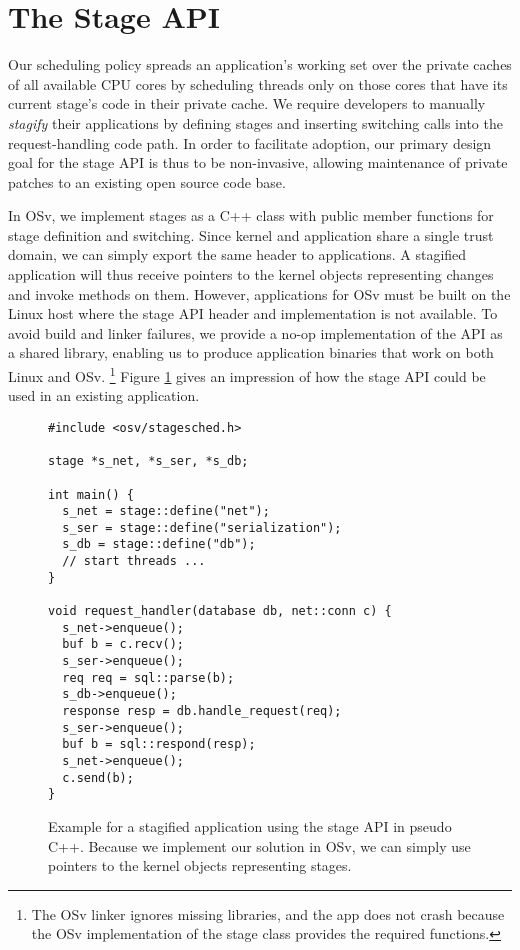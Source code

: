 \documentclass[12pt,a4paper]{book}
\begin{document}
\section{The Stage API}\label{ch:di:api}
Our scheduling policy spreads an application's working set over the private caches of all available CPU cores by scheduling threads only on those cores that have its current stage's code in their private cache.
We require developers to manually \emph{stagify} their applications by defining stages and inserting switching calls into the request-handling code path.
In order to facilitate adoption, our primary design goal for the stage API is thus to be non-invasive, allowing maintenance of private patches to an existing open source code base.

In OSv, we implement stages as a C++ class with public member functions for stage definition and switching.
Since kernel and application share a single trust domain, we can simply export the same header to applications.
A stagified application will thus receive pointers to the kernel objects representing changes and invoke methods on them.
However, applications for OSv must be built on the Linux host where the stage API header and implementation is not available.
To avoid build and linker failures, we provide a no-op implementation of the API as a shared library, enabling us to produce application binaries that work on both Linux and OSv.%
\footnote{The OSv linker ignores missing libraries, and the app does not crash because the OSv implementation of the stage class provides the required functions.}
Figure \ref{fig:di:api:exampleraw} gives an impression of how the stage API could be used in an existing application.

\begin{figure}[H]
\begin{lstlisting}[style=figurecpp,morekeywords={stage,stage::define,enqueue}]
#include <osv/stagesched.h>

stage *s_net, *s_ser, *s_db;

int main() {
  s_net = stage::define("net");
  s_ser = stage::define("serialization");
  s_db = stage::define("db");
  // start threads ...
}

void request_handler(database db, net::conn c) {
  s_net->enqueue();
  buf b = c.recv();
  s_ser->enqueue();
  req req = sql::parse(b);
  s_db->enqueue();
  response resp = db.handle_request(req);
  s_ser->enqueue();
  buf b = sql::respond(resp);
  s_net->enqueue();
  c.send(b);
}
\end{lstlisting}
\caption{Example for a stagified application using the stage API in pseudo C++. Because we implement our solution in OSv, we can simply use pointers to the kernel objects representing stages.}
\label{fig:di:api:exampleraw}
\end{figure}
\end{document}
